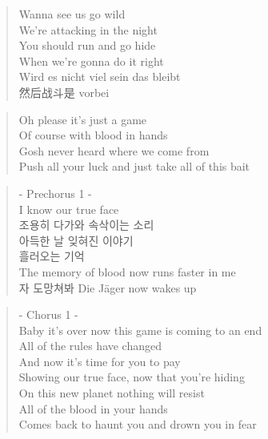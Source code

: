 \begin{verse}
Wanna see us go wild \\
We're attacking in the night\\
You should run and go hide\\
When we're gonna do it right\\
Wird es nicht viel sein das bleibt\\
然后战斗是 vorbei
\end{verse}

\begin{verse}
Oh please it's just a game\\
Of course with blood in hands\\
Gosh never heard where we come from\\
Push all your luck and just take all of this bait 
\end{verse}

\begin{verse}
- Prechorus 1 -\\
I know our true face\\
조용히 \ks 다가와 \ks 속삭이는 \ks 소리\\
아득한 \ks 날 \ks 잊혀진 \ks 이야기 \\
흘러오는 \ks 기억 \\
The memory of blood now runs faster in me\\
자 \ks 도망쳐봐 Die Jäger now wakes up
\end{verse}

\begin{verse}
- Chorus 1 -\\
Baby it's over now this game is coming to an end\\
All of the rules have changed \\
And now it's time for you to pay\\
Showing our true face, now that you're hiding \\
On this new planet nothing will resist \\
All of the blood in your hands\\
Comes back to haunt you and drown you in fear\\
\end{verse}

\clearpage

